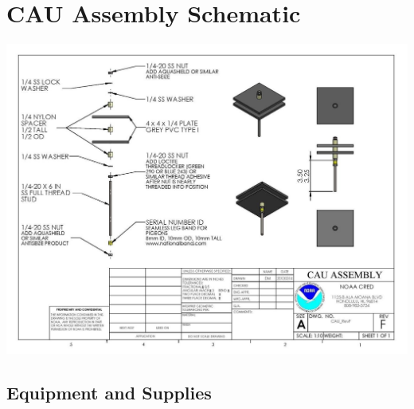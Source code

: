 \documentclass[
]{book}
\begin{document}
\hypertarget{cau-assembly-schematic}{%
\section{CAU Assembly Schematic}\label{cau-assembly-schematic}}

\includegraphics{images/CAU_assembly.jpg}

\hypertarget{equipment-and-supplies}{%
\subsection{Equipment and Supplies}\label{equipment-and-supplies}}
\end{document}
